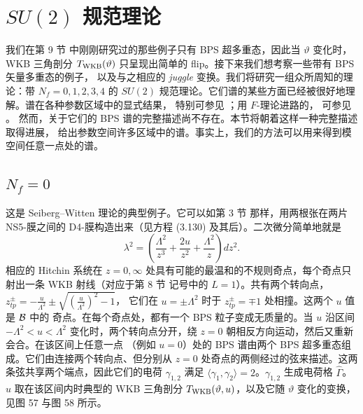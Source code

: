\section{$SU(2)$ 规范理论}\label{section:SU2Examples}

我们在第 9 节%
中刚刚研究过的那些例子只有 BPS 超多重态，因此当 $\vartheta$ 变化时，WKB 三角剖分
$T_{\rm WKB}(\vartheta)$ 只呈现出简单的 flip。接下来我们想考察一些带有 BPS 矢量多重态的例子，
以及与之相应的 \emph{juggle} 变换。我们将研究一组众所周知的理论：带 $N_f=0, 1, 2, 3, 4$
的 $SU(2)$ 规范理论。它们谱的某些方面已经被很好地理解。谱在各种参数区域中的显式结果，
特别可参见 \cite{Bilal:1996sk,Ferrari:1996sv,Ferrari:1997gu}；用 $F$-理论进路的，
可参见 \cite{Banks:1996nj,Douglas:1996js,Gaberdiel:1998mv,Mikhailov:1998bx,DeWolfe:1998bi}。
然而，关于它们的 BPS 谱的完整描述尚不存在。本节将朝着这样一种完整描述取得进展，
给出参数空间许多区域中的谱。事实上，我们的方法可以用来得到模空间任意一点处的谱。

\subsection{$N_f=0$}\label{sec:nf0}

这是 Seiberg--Witten 理论的典型例子。它可以如第 3 节%
那样，用两根张在两片 NS5-膜之间的 D4-膜构造出来（见方程 (3.130)%
及其后）。二次微分简单地就是
\begin{equation}
\lambda^2 = \left( \frac{\Lambda^2}{z^3} + \frac{2u}{z^2} + \frac{\Lambda^2}{z} \right) dz^2.
\end{equation}
相应的 Hitchin 系统在 $z=0, \infty$ 处具有可能的最温和的不规则奇点，每个奇点只射出一条
WKB 射线（对应于第 8 节%
记号中的 $L=1$）。共有两个转向点，$z_{tp}^\pm = -\frac{u}{\Lambda^2} \pm \sqrt{(\frac{u}{\Lambda^2})^2-1}$，
它们在 $u = \pm \Lambda^2$ 时于 $z_{tp}^\pm = \mp 1$ 处相撞。这两个 $u$ 值是 $\mathcal{B}$ 中的
奇点。在每个奇点处，都有一个 BPS 粒子变成无质量的。当 $u$ 沿区间 $-\Lambda^2 < u < \Lambda^2$
变化时，两个转向点分开，绕 $z=0$ 朝相反方向运动，然后又重新会合。在该区间上任意一点
（例如 $u=0$）处的 BPS 谱由两个 BPS 超多重态组成。它们由连接两个转向点、但分别从
$z=0$ 处奇点的两侧经过的弦来描述。这两条弦共享两个端点，因此它们的电荷 $\gamma_{1,2}$
满足 $\langle \gamma_1, \gamma_2 \rangle = 2$。$\gamma_{1,2}$ 生成电荷格 $\hat\Gamma$。
$u$ 取在该区间内时典型的 WKB 三角剖分 $T_{\rm WKB}(\vartheta,u)$，以及它随 $\vartheta$
变化的变换，见图 57%
与图 58%
所示。

